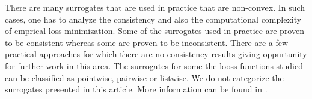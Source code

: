 There are many surrogates that are used in practice that are non-convex. In such cases, one has to analyze the consistency and also the computational complexity of emprical loss minimization. Some of the surrogates used in practice are proven to be consistent whereas some are proven to be inconsistent. There are a few practical approaches for which there are no consistency results giving oppurtunity for further work in this area. The surrogates for some the looss functions studied can be classified as pointwise, pairwise or listwise. We do not categorize the surrogates presented in this article. More information can be found in \cite{li2011short}.

